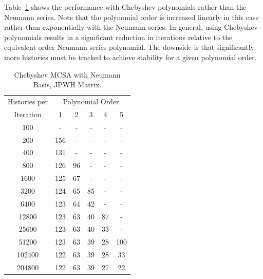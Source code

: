 \documentclass[10pt]{article}
\begin{document}
Table~\ref{tab:jpwh_cheby_neumann} shows the performance
with Chebyshev polynomials rather than the Neumann
series.  Note that the polynomial order is increased
linearly in this case rather than exponentially with the
Neumann series.  In general, using Chebyshev polynomials
results in a significant reduction in iterations relative to
the equivalent order Neumann series polynomial.  The
downside is that significantly more histories must be
tracked to achieve stability for a given polynomial order.
\begin{table}
\caption{Chebyshev MCSA with Neumann Basis, JPWH Matrix. 
\label{tab:jpwh_cheby_neumann}}
\centering
\begin{tabular}{cccccc}
 \toprule
 Histories per & \multicolumn{5}{c}{Polynomial Order} \\
 Iteration & 1 & 2 & 3 & 4 & 5 \\
 \midrule
 100 & - & - & - & - & - \\
 200 & 156 & - & - & - & - \\
 400 & 131 & - & - & - & - \\
 800 & 126 & 96 & - & - & - \\
 1600 & 125 & 67 & - & - & - \\
 3200 & 124 & 65 & 85 & - & - \\
 6400 & 123 & 64 & 42 & - & - \\
 12800 & 123 & 63 & 40 & 87 & - \\
 25600 & 123 & 63 & 40 & 33 & - \\
 51200 & 123 & 63 & 39 & 28 & 100 \\
 102400 & 122 & 63 & 39 & 28 & 33 \\
 204800 & 122 & 63 & 39 & 27 & 22 \\
\bottomrule
\end{tabular}
\end{table}
\end{document}
